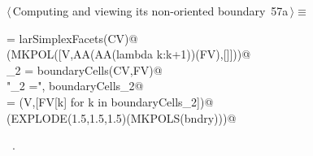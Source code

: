 \documentclass[11pt,oneside]{article}	%
\begin{document}
\begin{flushleft} \small \label{scrap103}
\protect{}$\langle\,$Computing and viewing its non-oriented boundary\nobreak\ {\footnotesize 57a}$\,\rangle\equiv$
\vspace{-1ex}
\begin{list}{}{} \item
\mbox{}\verb@FV = larSimplexFacets(CV)@\\
\mbox{}\verb@VIEW(MKPOL([V,AA(AA(lambda k:k+1))(FV),[]]))@\\
\mbox{}\verb@boundaryCells_2 = boundaryCells(CV,FV)@\\
\mbox{}\verb@print "\nboundaryCells_2 =\n", boundaryCells_2@\\
\mbox{}\verb@bndry = (V,[FV[k] for k in boundaryCells_2])@\\
\mbox{}\verb@VIEW(EXPLODE(1.5,1.5,1.5)(MKPOLS(bndry)))@\\
\mbox{}\verb@@{\NWsep}
\end{list}
\vspace{-1ex}
\footnotesize\addtolength{\baselineskip}{-1ex}
\begin{list}{}{\setlength{\itemsep}{-\parsep}\setlength{\itemindent}{-\leftmargin}}
\item \NWtxtMacroRefIn\ .
\end{list}
\end{flushleft}
\end{document}
